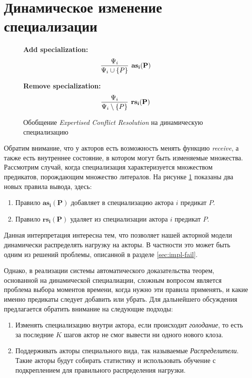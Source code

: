 \section{Динамическое изменение специализации}
\label{sec:onlineChanging}
\begin{figure}\begin{calculus}\centering

\textbf{Add specialization:}
$$
\infer[\mathbf{as_i(P)}]
      {\Psi_i \cup \{P\}}
	  {\Psi_i}
$$

\bigskip

\textbf{Remove specialization:}
$$
\infer[\mathbf{rs_i(P)}]
      {\Psi_i \setminus \{P\}}
      {\Psi_i}
$$ 
\end{calculus}
\caption{Обобщение \emph{Expertised Conflict Resolution} на динамическую специализацию}
\label{fig:onlineC}
\end{figure}

Обратим внимание, что у акторов есть возможность менять функцию \emph{receive}, а также есть внутреннее состояние, в котором могут быть изменяемые множества. Рассмотрим случай, когда специализация характеризуется множеством предикатов, порождающим множество литералов. На рисунке \ref{fig:onlineC} показаны два новых правила вывода, здесь: 
\begin{enumerate}
	\item Правило $\mathbf{as_i(P)}$ добавляет в специализацию актора $i$ предикат $P$.
    \item Правило $\mathbf{rs_i(P)}$ удаляет из специализации актора $i$ предикат $P$.
\end{enumerate}

Данная интерпретация интересна тем, что позволяет нашей акторной модели динамически распределять нагрузку на акторы. В частности это может быть одним из решений проблемы, описанной в разделе \ref{sec:impl-fail}.

Однако, в реализации системы автоматического доказательства теорем, основанной на динамической специалиации, сложным вопросом является проблема выбора моментов времени, когда нужно эти правила применять, и какие именно предикаты следует добавить или убрать. Для дальнейшего обсуждения предлагается обратить внимание на следующие подходы:
\begin{enumerate}
	\item Изменять специализацию внутри актора, если происходит \emph{голодание}, то есть за последние $K$ шагов актор не смог вывести ни одного нового клоза. 
    \item Поддерживать акторы специального вида, так называемые \emph{Распределители}. Такие акторы будут собирать статистику и использовать обучение с подкреплением для правильного распределения нагрузки.
\end{enumerate}


